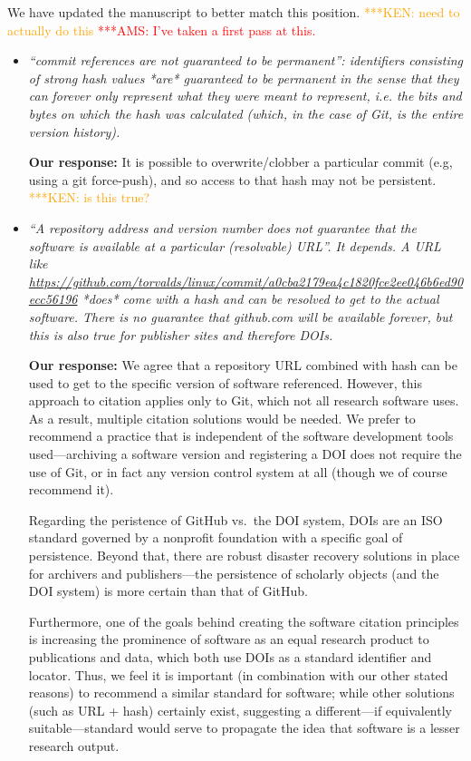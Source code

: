 \documentclass{article}
\newcommand{\niemnote}[1]{ {\textcolor{orange} { ***KEN: #1 }}} %
\newcommand{\asnote}[1]{ {\textcolor{red} { ***AMS: #1 }}} %
\begin{document}
\begin{enumerate}
We have updated the manuscript to better match this position.
\niemnote{need to actually do this}
\asnote{I've taken a first pass at this.}
\begin{itemize}

\item \emph{``commit references are not guaranteed to be permanent'':
identifiers consisting of strong hash values *are* guaranteed to be permanent
in the sense that they can forever only represent what they were meant to
represent, i.e. the bits and bytes on which the hash was calculated (which, in
the case of Git, is the entire version history).}

\textbf{Our response:}
It is possible to overwrite\slash clobber a particular commit (e.g, using a
git force-push), and so access to that hash may not be persistent.\niemnote{is this true?}

\item \emph{``A repository address and version number does not guarantee that
the software is available at a particular (resolvable) URL''. It depends. A URL
like \url{https://github.com/torvalds/linux/commit/a0cba2179ea4c1820fce2ee046b6ed90ecc56196}
*does* come with a hash and can be resolved to get to the actual software.
There is no guarantee that github.com will be available forever, but this is
also true for publisher sites and therefore DOIs.}

\textbf{Our response:}
We agree that a repository URL combined with hash can be used to get to
the specific version of software referenced. However, this approach to citation
applies only to Git, which not all research software uses. As a result, multiple
citation solutions would be needed. We prefer to recommend a practice that is
independent of the software development tools used---archiving a software
version and registering a DOI does not require the use of Git, or in fact any
version control system at all (though we of course recommend it).

Regarding the peristence of GitHub vs.\ the DOI system, DOIs are an ISO standard
governed by a nonprofit foundation with a specific goal of persistence. Beyond
that, there are robust disaster recovery solutions in place for archivers and
publishers---the persistence of scholarly objects (and the DOI system) is
more certain than that of GitHub.

Furthermore, one of the goals behind creating the software citation principles
is increasing the prominence of software as an equal research product to
publications and data, which both use DOIs as a standard identifier and locator.
Thus, we feel it is important (in combination with our other stated reasons) to
recommend a similar standard for software; while other solutions (such as URL +
hash) certainly exist, suggesting a different---if equivalently suitable---standard
would serve to propagate the idea that software is a lesser research output.


\end{itemize}
\end{enumerate}
\end{document}
